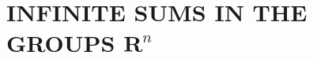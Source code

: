 \section{\texorpdfstring{INFINITE SUMS IN THE GROUPS \(\mathbf{R}^n\)}{INFINITE SUMS IN THE GROUPS R TO THE N}}

